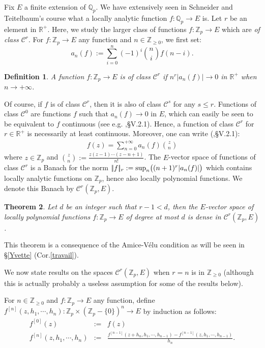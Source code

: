 \documentclass[11pt]{amsart}
\def\Z{{\mathbb Z}_p}
\def\Q{{\mathbb Q}_p}
\newtheorem{definit}{\bf{Definition}}[subsection]
\newtheorem{thm}[definit]{\bf{Theorem}}
\begin{document}
Fix $E$ a finite extension of $\Q$. We have extensively seen in
Schneider and Teitelbaum's course what a locally analytic function
$f:\Q\rightarrow E$ is. Let $r$ be an element in ${\mathbb
R}^+$. Here, we study the larger class of functions $f:\Z\rightarrow
E$ which are {\it of class ${\mathcal C}^r$}. For $f:\Z\rightarrow E$
any function and $n\in {\mathbb Z}_{\geq 0}$, we first set:
$$a_n(f):=\sum_{i=0}^n(-1)^i{n \choose i}f(n-i).$$ 
 
\begin{definit}\label{classcr} 
A function $f:\Z\rightarrow E$ is of class ${\mathcal C}^r$ if
$n^r|a_n(f)|\rightarrow 0$ in ${\mathbb R}^+$ when $n\rightarrow
+\infty$. 
\end{definit} 
 
Of course, if $f$ is of class ${\mathcal C}^r$, then it is also of
class ${\mathcal C}^s$ for any $s\leq r$. Functions of class
${\mathcal C}^0$ are functions $f$ such that $a_n(f)\rightarrow 0$ in
$E$, which can easily be seen to be equivalent to $f$ continuous (see
e.g. \cite{Co2},\S V.2.1). Hence, a function of class ${\mathcal C}^r$
for $r\in {\mathbb R}^+$ is necessarily at least continuous. Moreover,
one can write (\cite{Co2},\S V.2.1): 
\begin{eqnarray}\label{mahler} 
f(z)=\sum_{n=0}^{+\infty}a_n(f){z\choose n} 
\end{eqnarray} 
where $z\in \Z$ and ${z\choose n}:=\frac{z(z-1)\cdots
  (z-n+1)}{n!}$. The $E$-vector space of functions of class ${\mathcal
  C}^r$ is a Banach for the norm $|\!|f|\!|_r:={\rm
  sup}_n\big((n+1)^{r}|a_n(f)|\big)$ which contains locally analytic
functions on $\Z$, hence also locally polynomial functions. We denote
this Banach by ${\mathcal C}^r(\Z,E)$.  

 
\begin{thm}\label{densitybase} 
Let $d$ be an integer such that $r-1<d$, then the $E$-vector space of
locally polynomial functions $f:\Z\rightarrow E$ of degree at most $d$
is dense in ${\mathcal C}^r(\Z,E)$. 
\end{thm} 
 
This theorem is a consequence of the Amice-V\'elu condition as will be
seen in \S\ref{Yvette} (Cor.\ref{travail}).

We now state results on the spaces ${\mathcal C}^r(\Z,E)$ when $r=n$
is in ${\mathbb Z}_{\geq 0}$ (although this is actually probably a
useless assumption for some of the results below).

For $n\in {\mathbb Z}_{\geq 0}$ and $f:\Z\rightarrow E$ any function,
define $f^{[n]}(z,h_1,\cdots,h_n):\Z\times (\Z-\{0\})^n\rightarrow E$
by induction as follows: 
\begin{eqnarray*}
f^{[0]}(z)&\!\!\!:=\!\!\!&f(z)\\
f^{[n]}(z,h_1,\cdots\!,h_n)&\!\!\!:=\!\!\!&\frac{f^{[n-1]}(z+h_n,h_1,\cdots\!,
h_{n-1})-f^{[n-1]}(z,h_1,\cdots\!,h_{n-1})}{h_n}.
\end{eqnarray*} 
 
\end{document}

